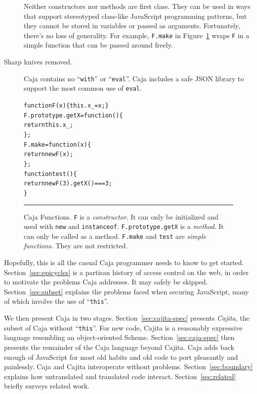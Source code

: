 \documentclass[letterpaper,twocolumn,10pt]{article}
\newcommand{\code}[1]{{\tt {#1}}}              %
\begin{document}
\begin{description}
  Neither constructors nor methods are first class. They can be used in ways 
  that support stereotyped class-like JavaScript programming patterns, but 
  they cannot be stored in variables or passed as arguments. Fortunately, 
  there's no loss of generality. For example, \code{F.make} in 
  Figure~\ref{fig:func-obj} wraps \code{F} in a simple function that can be 
  passed around freely.
 
  \item[Sharp knives removed.] Caja contains no ``\code{with}'' or 
  ``\code{eval}''. Caja includes a safe JSON library to support the most 
  common use of \code{eval}.
 
\end{description}

\begin{figure}[t!]
\begin{alltt}
function F(x) \{ this.x_ = x; \}
F.prototype.getX = function() \{
  return this.x_;
\};
F.make = function(x) \{
  return new F(x);
\};
function test() \{
  return new F(3).getX() === 3;
\}
\end{alltt}

\caption[Caja Functions]{Caja Functions. \code{F} is a \emph{constructor}. It 
can only be initialized and used with \code{new} and \code{instanceof}. 
\code{F.prototype.getX} is a \emph{method}. It can only be called as a 
method. \code{F.make} and \code{test} are \emph{simple functions}. They are
not restricted. \\ } \hrule
\label{fig:func-obj}
\end{figure}

Hopefully, this is all the casual Caja programmer needs to know to get 
started. Section~\ref{sec:epicycles} is a partisan history of access control 
on the web, in order to motivate the problems Caja addresses. It may safely 
be skipped. Section~\ref{sec:subset} explains the problems faced when 
securing JavaScript, many of which involve the use of ``\code{this}''.

We then present Caja in two stages. Section~\ref{sec:cajita-spec} presents 
\emph{Cajita}, the subset of Caja without ``\code{this}''. For new code, 
Cajita is a reasonably expressive language resembling an object-oriented 
Scheme. Section~\ref{sec:caja-spec} then presents the remainder of the Caja 
language beyond Cajita. Caja adds back enough of JavaScript for most old 
habits and old code to port pleasantly and painlessly. Caja and Cajita 
interoperate without problems. Section~\ref{sec:boundary} explains how 
untranslated and translated code interact. Section~\ref{sec:related} briefly 
surveys related work.
\end{document}
